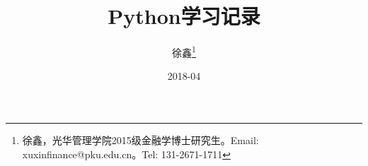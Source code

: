\documentclass[cs4size, punct, nospace, fancyhdr, fnter, hyperref, UTF8, twosides]{ctexart}
\theoremstyle{definition}
\numberwithin{equation}{section}  %
\begin{document}
\title{Python学习记录}
\author{徐鑫\footnote{徐鑫，光华管理学院2015级金融学博士研究生。Email: xuxinfinance@pku.edu.cn。Tel: 131-2671-1711}}
\date{2018-04}
\maketitle
\tableofcontents
\newpage
\end{document}

